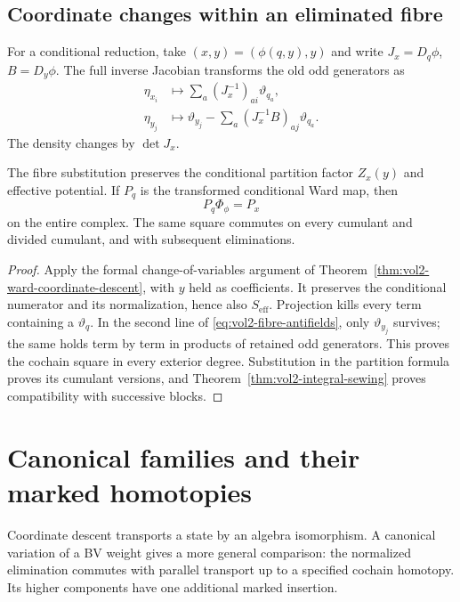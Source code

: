 \subsection{Coordinate changes within an eliminated fibre}

For a conditional reduction, take
$(x,y)=(\phi(q,y),y)$ and write
$J_x=D_q\phi$, $B=D_y\phi$.
The full inverse Jacobian transforms the old odd generators as
\begin{equation}\label{eq:vol2-fibre-antifields}
 \begin{aligned}
 \eta_{x_i}&\longmapsto
                     \sum_a(J_x^{-1})_{ai}\vartheta_{q_a},\\
 \eta_{y_j}&\longmapsto\vartheta_{y_j}
                     -\sum_a(J_x^{-1}B)_{aj}\vartheta_{q_a}.
 \end{aligned}
\end{equation}
The density changes by $\det J_x$.

\begin{proposition}\label{prop:vol2-conditional-coordinate-square}
The fibre substitution preserves the conditional partition
factor $Z_x(y)$ and effective potential. If $P_q$ is the
transformed conditional Ward map, then
\[
 P_q\Phi_\phi=P_x
\]
on the entire complex. The same square commutes on every
cumulant and divided cumulant, and with subsequent eliminations.
\end{proposition}
\begin{proof}
Apply the formal change-of-variables argument of
Theorem~\ref{thm:vol2-ward-coordinate-descent}, with $y$
held as coefficients. It preserves the conditional numerator
and its normalization, hence also $S_{\mathrm{eff}}$.
Projection kills every term containing a $\vartheta_q$.
In the second line of \eqref{eq:vol2-fibre-antifields}, only
$\vartheta_{y_j}$ survives; the same holds term by term in
products of retained odd generators. This proves the cochain
square in every exterior degree. Substitution in the
partition formula proves its cumulant versions, and
Theorem~\ref{thm:vol2-integral-sewing} proves compatibility
with successive blocks.
\end{proof}

\section{Canonical families and their marked homotopies}
\label{sec:vol2-gauge-state-homotopies}

Coordinate descent transports a state by an algebra isomorphism.
A canonical variation of a BV weight gives a more general
comparison: the normalized elimination commutes with parallel
transport up to a specified cochain homotopy. Its higher
components have one additional marked insertion.

